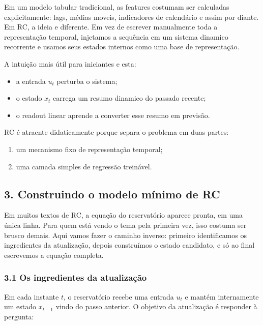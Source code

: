 \documentclass[12pt]{article}
\providecommand{\tightlist}{%
          \setlength{\itemsep}{0pt}\setlength{\parskip}{0pt}}
\begin{document}
Em um modelo tabular tradicional, as features costumam ser calculadas explicitamente: lags, médias moveis, indicadores de calendário e assim por diante. Em RC, a ideia e diferente. Em vez de escrever manualmente toda a representação temporal, injetamos a sequência em um sistema dinamico recorrente e usamos seus estados internos como uma base de representação.

A intuição mais útil para iniciantes e esta:

\begin{itemize}
\tightlist
\item
  a entrada \(u_t\) perturba o sistema;
\item
  o estado \(x_t\) carrega um resumo dinamico do passado recente;
\item
  o readout linear aprende a converter esse resumo em previsão.
\end{itemize}

RC é atraente didaticamente porque separa o problema em duas partes:

\begin{enumerate}
\def\labelenumi{\arabic{enumi}.}
\tightlist
\item
  um mecanismo fixo de representação temporal;
\item
  uma camada simples de regressão treinável.
\end{enumerate}

\subsection{3. Construindo o modelo mínimo de RC}\label{3-construindo-o-modelo-muxednimo-de-rc}

Em muitos textos de RC, a equação do reservatório aparece pronta, em uma única linha. Para quem está vendo o tema pela primeira vez, isso costuma ser brusco demais. Aqui vamos fazer o caminho inverso: primeiro identificamos os ingredientes da atualização, depois construímos o estado candidato, e só ao final escrevemos a equação completa.

\subsubsection{3.1 Os ingredientes da atualização}\label{31-os-ingredientes-da-atualizauxe7uxe3o}

Em cada instante \(t\), o reservatório recebe uma entrada \(u_t\) e mantém internamente um estado \(x_{t-1}\) vindo do passo anterior. O objetivo da atualização é responder à pergunta:
\end{document}
